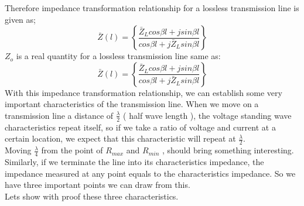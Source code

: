 Therefore impedance transformation relationship for a lossless transmission line is given as;
\begin{equation}
\bar{Z}(l) = \left\lbrace \frac{\bar{Z}_Lcos\beta l + jsin\beta l}{cos\beta l + j\bar{Z}_Lsin\beta l}\right\rbrace 
\end{equation}
$Z_o$ is a real quantity for a lossless transmission line same as:
\begin{equation}
\bar{Z}(l) = \left\lbrace \frac{\bar{Z}_Lcos\beta l + jsin\beta l}{cos\beta l + j\bar{Z}_Lsin\beta l}\right\rbrace 
\end{equation}
With this impedance transformation relationship, we can establish some very important characteristics of the transmission line. When we move on a transmission line a distance of $\frac{\lambda}{2}$ ( half wave length ), the voltage standing wave characteristics repeat itself, so if we take a ratio of voltage and current at a certain location, we expect that this characteristic will repeat at $\frac{\lambda}{2}$.\\
Moving $\frac{\lambda}{4}$ from the point of $R_{max}$ and $R_{min}$ , should bring something interesting. Similarly, if we terminate the line into its characteristics impedance, the impedance measured at any point equals to the characteristics impedance. So we have three important points we can draw from this.\\
Lets show with proof these three characteristics.
